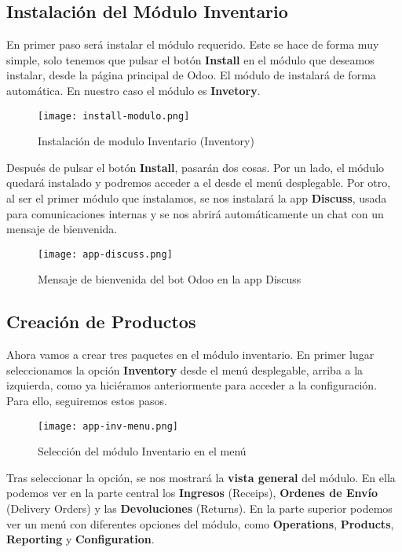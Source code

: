 \subsection{Instalación del Módulo Inventario}
En primer paso será instalar el módulo requerido. Este se hace de forma muy simple, solo tenemos que pulsar el botón \textbf{Install} en el módulo que deseamos instalar, desde la página principal de Odoo. El módulo de instalará de forma automática. En nuestro caso el módulo es \textbf{Invetory}.

\begin{figure}[h]
    \centering
    \texttt{[image: install-modulo.png]}
    \caption{Instalación de modulo Inventario (Inventory)}
\end{figure}

Después de pulsar el botón \textbf{Install}, pasarán dos cosas. Por un lado, el módulo quedará instalado y podremos acceder a el desde el menú desplegable. Por otro, al ser el primer módulo que instalamos, se nos instalará la app \textbf{Discuss}, usada para comunicaciones internas y se nos abrirá automáticamente un chat con un mensaje de bienvenida.

\begin{figure}[h]
    \centering
    \texttt{[image: app-discuss.png]}
    \caption{Mensaje de bienvenida del bot Odoo en la app Discuss}
\end{figure}

\subsection{Creación de Productos}
Ahora vamos a crear tres paquetes en el módulo inventario. En primer lugar seleccionamos la opción \textbf{Inventory} desde el menú desplegable, arriba a la izquierda, como ya hiciéramos anteriormente para acceder a la configuración. Para ello, seguiremos estos pasos.


\begin{figure}[h]
    \centering
    \texttt{[image: app-inv-menu.png]}
    \caption{Selección del módulo Inventario en el menú}
\end{figure}

Tras seleccionar la opción, se nos mostrará la \textbf{vista general} del módulo. En ella podemos ver en la parte central los \textbf{Ingresos} (Receips), \textbf{Ordenes de Envío} (Delivery Orders) y las \textbf{Devoluciones} (Returns). En la parte superior podemos ver un menú con diferentes opciones del módulo, como \textbf{Operations}, \textbf{Products}, \textbf{Reporting} y \textbf{Configuration}.

